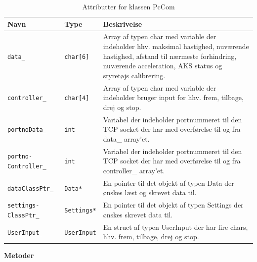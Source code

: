 \begin{table}[h]
\begin{tabularx}{\textwidth}{| Z | Z | L{10cm} |} \hline
Navn & Type & Beskrivelse \\\hline
\texttt{data\_}					& \texttt{char[6]}	&Array af typen char med variable der indeholder hhv. maksimal hastighed, nuværende hastighed, afstand til nærmeste forhindring, nuværende acceleration, AKS status og styretøjs calibrering.\\\hline

\texttt{controller\_}			& \texttt{char[4]}	&Array af typen char med variable der indeholder bruger input for hhv. frem, tilbage, drej og stop.\\\hline

\texttt{portnoData\_}			& \texttt{int}		&Variabel der indeholder portnummeret til den TCP socket der har med overførelse til og fra data\_ array'et.\\\hline

\texttt{portno- Controller\_}	& \texttt{int}		&Variabel der indeholder portnummeret til den TCP socket der har med overførelse til og fra controller\_ array'et.\\\hline

\texttt{dataClassPtr\_}			& \texttt{Data*}	&En pointer til det objekt af typen Data der ønskes læst og skrevet data til.\\\hline

\texttt{settings- ClassPtr\_}	& \texttt{Settings*}&En pointer til det objekt af typen Settings der ønskes skrevet data til.\\\hline

\texttt{UserInput\_}			& \texttt{UserInput}&En struct af typen UserInput der har fire chars, hhv. frem, tilbage, drej og stop.\\\hline
\end{tabularx}
\caption{Attributter for klassen PcCom}
\label{table:attr_pccom}
\end{table}

\clearpage

\textbf{Metoder}

